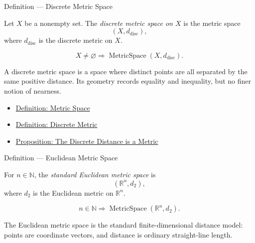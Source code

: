 \begin{definitionbox}{Definition --- Discrete Metric Space}
\begin{definition}\label{def:discrete-metric-space}
Let \(X\) be a nonempty set.  The \emph{discrete metric space on \(X\)} is the
metric space
\[
  (X,d_{\mathrm{disc}}),
\]
where \(d_{\mathrm{disc}}\) is the discrete metric on \(X\).
\end{definition}
\end{definitionbox}

\begin{remark*}
\[
X\neq\varnothing
\Longrightarrow
\operatorname{MetricSpace}(X,d_{\mathrm{disc}}).
\]
\end{remark*}

\begin{remark*}[Interpretation]
A discrete metric space is a space where distinct points are all separated by
the same positive distance.  Its geometry records equality and inequality, but
no finer notion of nearness.
\end{remark*}

\begin{dependencies}
\begin{itemize}
  \item \hyperref[def:metric-space]{Definition: Metric Space}
  \item \hyperref[def:discrete-metric]{Definition: Discrete Metric}
  \item \hyperref[prop:discrete-metric-space]{Proposition: The Discrete Distance is a Metric}
\end{itemize}
\end{dependencies}

\begin{definitionbox}{Definition --- Euclidean Metric Space}
\begin{definition}\label{def:euclidean-metric-space}
For \(n\in\mathbb{N}\), the \emph{standard Euclidean metric space} is
\[
  (\mathbb{R}^n,d_2),
\]
where \(d_2\) is the Euclidean metric on \(\mathbb{R}^n\).
\end{definition}
\end{definitionbox}

\begin{remark*}
\[
n\in\mathbb{N}
\Longrightarrow
\operatorname{MetricSpace}(\mathbb{R}^n,d_2).
\]
\end{remark*}

\begin{remark*}[Interpretation]
The Euclidean metric space is the standard finite-dimensional distance model:
points are coordinate vectors, and distance is ordinary straight-line length.
\end{remark*}

